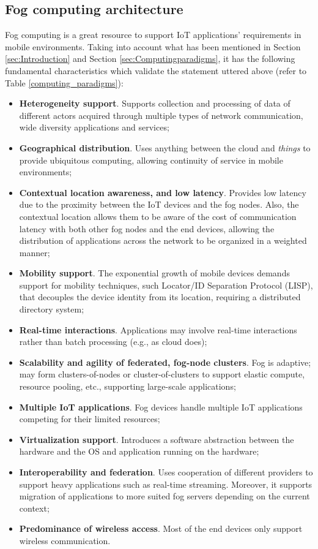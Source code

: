 \subsection{Fog computing architecture}
\label{sec:fog_architecture}
Fog computing is a great resource to support IoT applications' requirements in mobile environments. Taking into account what has been mentioned in Section \ref{sec:Introduction} and Section \ref{sec:Computingparadigms}, it has the following fundamental characteristics which validate the statement uttered above (refer to Table \ref{computing_paradigms}):
\begin{itemize}
	\item \textbf{Heterogeneity support}. Supports collection and processing of data of different actors acquired through multiple types of network communication, wide diversity applications and services;
	\item \textbf{Geographical distribution}. Uses anything between the cloud and \textit{things} to provide ubiquitous computing, allowing continuity of service in mobile environments;
	\item \textbf{Contextual location awareness, and low latency}. Provides low latency due to the proximity between the IoT devices and the fog nodes. Also, the contextual location allows them to be aware of the cost of communication latency with both other fog nodes and the end devices, allowing the distribution of applications across the network to be organized in a weighted manner;
	\item \textbf{Mobility support}. The exponential growth of mobile devices demands support for mobility techniques, such Locator/ID Separation Protocol (LISP), that decouples the device identity from its location, requiring a distributed directory system;
	\item \textbf{Real-time interactions}. Applications may involve real-time interactions rather than batch processing (e.g., as cloud does);
	\item \textbf{Scalability and agility of federated, fog-node clusters}. Fog is adaptive; may form clusters-of-nodes or cluster-of-clusters to support elastic compute, resource pooling, etc., supporting large-scale applications;
	\item \textbf{Multiple IoT applications}. Fog devices handle multiple IoT applications competing for their limited resources;
	\item \textbf{Virtualization support}. Introduces a software abstraction between the hardware and the OS and application running on the hardware;
	\item \textbf{Interoperability and federation}. Uses cooperation of different providers to support heavy applications such as real-time streaming. Moreover, it supports migration of applications to more suited fog servers depending on the current context;
	\item \textbf{Predominance of wireless access}. Most of the end devices only support wireless communication.
\end{itemize}

